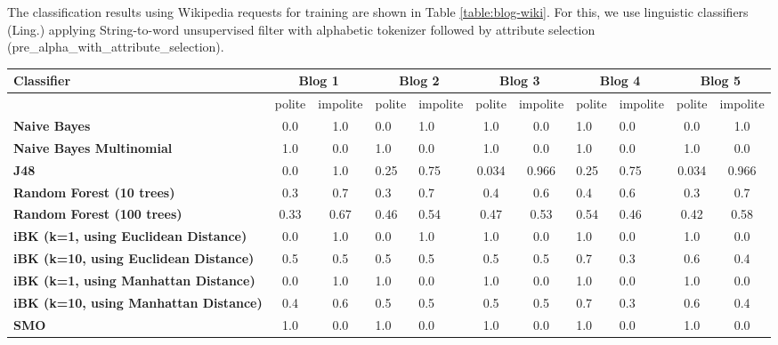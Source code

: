 \documentclass[conference]{IEEEtran}
\begin{document}
The classification results using Wikipedia requests for training are shown in Table \ref{table:blog-wiki}. For this, we use linguistic classifiers (Ling.) applying String-to-word unsupervised filter with alphabetic tokenizer followed by attribute selection (pre\_alpha\_with\_attribute\_selection). 

\begin{table*}[htbp]
\caption{Classification results using Wikipedia requests for training}
\centering
\vspace{5pt}
\begin{tabular}{|l|c|c|l|l|c|c|l|l|c|c|}
\hline
\textbf{Classifier} & \multicolumn{2}{|c|}{\textbf{Blog 1}} & \multicolumn{2}{|c|}{\textbf{Blog 2}} & \multicolumn{2}{|c|}{\textbf{Blog 3}} & \multicolumn{2}{|c|}{\textbf{Blog 4}} & \multicolumn{2}{|c|}{\textbf{Blog 5}} \\
\hline
& polite & impolite & polite & impolite & polite & impolite & polite & impolite & polite & impolite \\
\hline\hline
\textbf{Naive Bayes} & 0.0 & 1.0 & 0.0 & 1.0 & 1.0 & 0.0 & 1.0 & 0.0 & 0.0 & 1.0 \\ 
\hline
\textbf{Naive Bayes Multinomial} & 1.0 & 0.0 & 1.0 & 0.0 & 1.0 & 0.0 & 1.0 & 0.0 & 1.0 & 0.0 \\ 
\hline
\textbf{J48} & 0.0 & 1.0 & 0.25 & 0.75 & 0.034 & 0.966 & 0.25 & 0.75 & 0.034 & 0.966 \\ 
\hline
\textbf{Random Forest (10 trees)} & 0.3 & 0.7 & 0.3 & 0.7 & 0.4 & 0.6 & 0.4 & 0.6 & 0.3 & 0.7 \\ 
\hline
\textbf{Random Forest (100 trees)} & 0.33 & 0.67 & 0.46 & 0.54 & 0.47 & 0.53 & 0.54 & 0.46 & 0.42 & 0.58 \\ 
\hline
\textbf{iBK (k=1, using Euclidean Distance)} & 0.0 & 1.0 & 0.0 & 1.0 & 1.0 & 0.0 & 1.0 & 0.0 & 1.0 & 0.0 \\ 
\hline
\textbf{iBK (k=10, using Euclidean Distance)} & 0.5 & 0.5 & 0.5 & 0.5 & 0.5 & 0.5 & 0.7 & 0.3 & 0.6 & 0.4 \\ 
\hline
\textbf{iBK (k=1, using Manhattan Distance)} & 0.0 & 1.0 & 1.0 & 0.0 & 1.0 & 0.0 & 1.0 & 0.0 & 1.0 & 0.0 \\ 
\hline
\textbf{iBK (k=10, using Manhattan Distance)} & 0.4 & 0.6 & 0.5 & 0.5 & 0.5 & 0.5 & 0.7 & 0.3 & 0.6 & 0.4 \\ 
\hline
\textbf{SMO} & 1.0 & 0.0 & 1.0 & 0.0 & 1.0 & 0.0 & 1.0 & 0.0 & 1.0 & 0.0 \\ 
\hline
\hline
\end{tabular}
\label{table:blog-wiki}
\end{table*}
\end{document}
